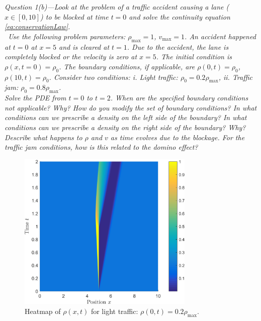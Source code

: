 \documentclass[11pt]{article}
\newcommand{\forceindent}{\leavevmode{\parindent=1em\indent}}
\begin{document}
\begin{tcolorbox}
  \textit{Question 1(b)---Look at the problem of a traffic accident causing a lane ($x \in [0, 10]$) to be blocked at time $t = 0$ and solve the continuity equation \eqref{eq:conservationLaw}. \\
  \forceindent~Use the following problem parameters: $\rho_\mathrm{max}=1$, $v_\mathrm{max} = 1$. An accident happened at $t = 0$ at $x = 5$ and is cleared at $t = 1$. Due to the accident, the lane is completely blocked or the velocity is zero at $x = 5$. The initial condition is $\rho(x, t = 0) = \rho_0$. The boundary conditions, if applicable, are $\rho(0, t) = \rho_0$, $\rho(10, t) = \rho_0$. Consider two conditions: \textit{i.} Light traffic: $\rho_0 = 0.2 \rho_\mathrm{max}$, \textit{ii.} Traffic jam: $\rho_0 = 0.8 \rho_\mathrm{max}$. \\
  \forceindent Solve the PDE from $t = 0$ to $t = 2$. When are the specified boundary conditions not applicable? Why? How do you modify the set of boundary conditions? In what conditions can we prescribe a density on the left side of the boundary? In what conditions can we prescribe a density on the right side of the boundary? Why? Describe what happens to $\rho$ and $v$ as time evolves due to the blockage. For the traffic jam conditions, how is this related to the domino effect?}
\end{tcolorbox}

\begin{figure}[h!]
  \centering
  \includegraphics[width=0.75\textwidth]{1b_light_surf.png}
  \caption{Heatmap of $\rho(x,t)$ for light traffic: $\rho(0,t) = 0.2\rho_\mathrm{max}$.}
  \label{fig:1b_light_surf}
\end{figure}
\end{document}
